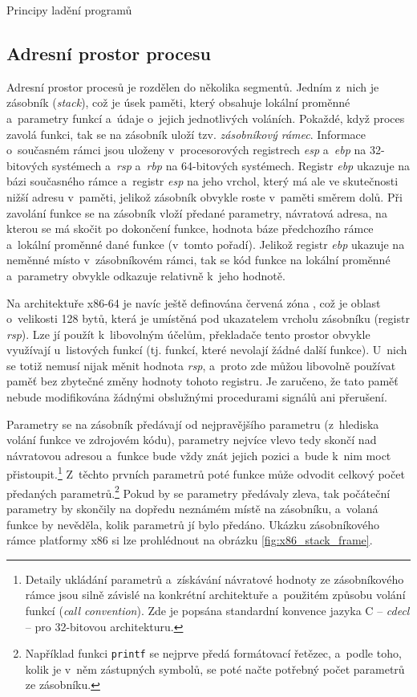 \documentclass[czech,bachelor,male,python,dept460,hidelinks]{diploma}						%
\newcommand{\parspace}[1][]{
	\ifthenelse{\isempty{#1}}{\vspace{0mm}}{\vspace{#1}}
	\par
}
\begin{document}
\begin{section}{Principy ladění programů}
	\subsection{Adresní prostor procesu}
		Adresní prostor procesů je rozdělen do několika segmentů. \cite[53]{tanenbaum} Jedním z~nich je zásobník (\textit{stack}), což je úsek paměti, který
		obsahuje lokální proměnné a~parametry funkcí a~údaje o~jejich jednotlivých voláních. Pokaždé, když proces zavolá funkci, tak se na zásobník uloží tzv.
		\textit{zásobníkový rámec}. Informace o~současném rámci jsou uloženy v~procesorových registrech \textit{esp} a~\textit{ebp} na 32-bitových systémech
		a~\textit{rsp} a~\textit{rbp} na 64-bitových systémech. Registr \textit{ebp} ukazuje na bázi současného rámce a~registr \textit{esp} na jeho vrchol, který
		má ale ve skutečnosti nižší adresu v~paměti, jelikož zásobník obvykle roste v~paměti směrem dolů. Při zavolání funkce se na zásobník vloží předané parametry,
		návratová adresa, na kterou se má skočit po dokončení funkce, hodnota báze předchozího rámce a~lokální proměnné dané funkce (v~tomto pořadí).
		Jelikož registr \textit{ebp} ukazuje na neměnné místo v~zásobníkovém rámci, tak se kód funkce na lokální proměnné a~parametry obvykle odkazuje
		relativně k~jeho hodnotě.
		
		\parspace Na architektuře x86-64 je navíc ještě definována červená zóna \cite[16]{x64abi}, což je oblast o~velikosti 128 bytů,
		která je umístěná pod ukazatelem vrcholu zásobníku (registr \textit{rsp}). Lze jí použít k~libovolným účelům, překladače tento prostor obvykle využívají
		u~listových funkcí (tj. funkcí, které nevolají žádné další funkce).
		U~nich se totiž nemusí nijak měnit hodnota \textit{rsp}, a~proto zde můžou libovolně používat paměť bez zbytečné změny hodnoty tohoto registru.
		Je zaručeno, že tato paměť nebude modifikována žádnými obslužnými procedurami signálů ani přerušení.
		
		\parspace Parametry se na zásobník předávají od nejpravějšího parametru (z~hlediska volání funkce ve zdrojovém kódu), parametry nejvíce vlevo tedy skončí
		nad návratovou adresou a~funkce bude vždy znát jejich pozici a~bude k~nim moct
		přistoupit.\footnote{Detaily ukládání parametrů a~získávání návratové hodnoty ze zásobníkového rámce jsou silně závislé na konkrétní architektuře 
		a~použitém způsobu volání funkcí (\textit{call convention}). Zde je popsána standardní konvence jazyka C -- \textit{cdecl} -- pro 32-bitovou architekturu.} 
		Z~těchto prvních parametrů poté funkce může odvodit celkový počet předaných parametrů.\footnote{Například funkci \texttt{printf} se nejprve předá formátovací
		řetězec, a~podle toho, kolik je v~něm zástupných symbolů, se poté načte potřebný počet parametrů ze zásobníku.} Pokud by se parametry předávaly zleva, tak
		počáteční parametry by skončily na dopředu neznámém místě na zásobníku, a~volaná funkce by nevěděla, kolik parametrů jí bylo předáno. Ukázku zásobníkového
		rámce platformy x86 si lze prohlédnout na obrázku \ref{fig:x86_stack_frame}.
		

\end{section}
\end{document}
